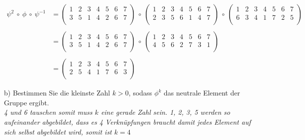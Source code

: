 \begin{align*}
\psi^{2} \ \circ \ \phi \ \circ \ \psi^{-1} &=
\begin{pmatrix}
1 & 2 & 3 & 4 & 5 & 6 & 7\\
3 & 5 & 1 & 4 & 2 & 6 & 7\\
\end{pmatrix} \ \circ \
\begin{pmatrix}
1 & 2 & 3 & 4 & 5 & 6 & 7\\
2 & 3 & 5 & 6 & 1 & 4 & 7\\
\end{pmatrix} \ \circ \
\begin{pmatrix}
1 & 2 & 3 & 4 & 5 & 6 & 7\\
6 & 3 & 4 & 1 & 7 & 2 & 5\\
\end{pmatrix}\\~\\
&=
\begin{pmatrix}
1 & 2 & 3 & 4 & 5 & 6 & 7\\
3 & 5 & 1 & 4 & 2 & 6 & 7\\
\end{pmatrix} \ \circ \
\begin{pmatrix}
1 & 2 & 3 & 4 & 5 & 6 & 7\\
4 & 5 & 6 & 2 & 7 & 3 & 1\\
\end{pmatrix}\\~\\
&=
\begin{pmatrix}
1 & 2 & 3 & 4 & 5 & 6 & 7\\
2 & 5 & 4 & 1 & 7 & 6 & 3\\
\end{pmatrix}
\end{align*}

\newpage

b) Bestimmen Sie die kleinste Zahl $k > 0$, sodass $\phi^{k}$ das neutrale Element der Gruppe ergibt.\\

\textit{4 und 6 tauschen somit muss $k$ eine gerade Zahl sein. 1, 2, 3, 5 werden so aufeinander abgebildet, dass es 4 Verknüpfungen braucht damit jedes Element auf sich selbst abgebildet wird, somit ist $k = 4$}\\

